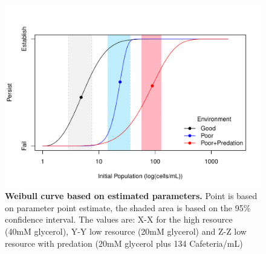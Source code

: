 \documentclass[a4paper,10pt]{article}
\begin{document}
\begin{figure}
\begin{center}
\includegraphics{MS_v1-fig2}
\end{center}
\caption{\textbf{Weibull curve based on estimated parameters.} Point is based on parameter point estimate, the shaded area is based on the 95\% confidence interval. The values are: X-X for the high resource (40mM glycerol), Y-Y low resource (20mM glycerol) and Z-Z low resource with predation (20mM glycerol plus 134 Cafeteria/mL)  
}
\end{figure}
\end{document}
